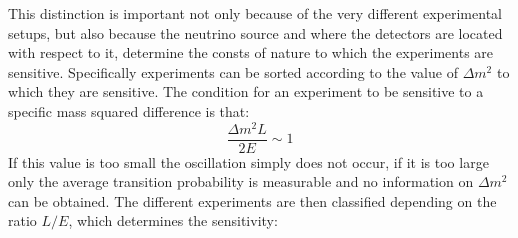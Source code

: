 \documentclass[12pt,a4paper,openright,twoside]{report}
\begin{document}
This distinction is important not only because of the very different experimental setups, but also because the neutrino source and where the detectors are located with respect to it, determine the consts of nature to which the experiments are sensitive. Specifically experiments can be sorted according to  the value of $\Delta m^2$ to which they are sensitive. The condition for an experiment to be sensitive to a specific mass squared difference is that:
\begin{equation}
\frac{\Delta m^2L}{2E}\sim 1
\end{equation}
If this value is too small the oscillation simply does not occur, if it is too large only the average transition probability is measurable and no information on $\Delta m^2$ can be obtained. The different experiments are then classified depending on the ratio $L/E$, which determines the sensitivity:
\end{document}
